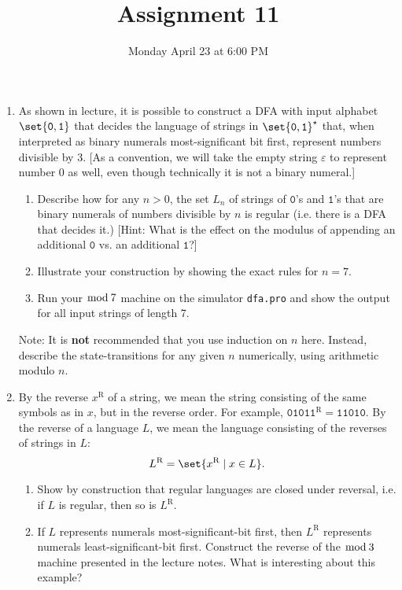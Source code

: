 \documentclass{cs81-homework}
\title{Assignment 11}
\date{Monday April 23 at 6:00 PM}
\author{}
\newcommand{\reverse}{{\text{R}}}
\begin{document}
\begin{introduction}
  \theintroduction
\end{introduction}

\begin{enumerate}
\item {} As shown in lecture, it is possible to construct a DFA with
  input alphabet \(\set{\mathtt 0, \mathtt 1}\) that decides the language of
  strings in \(\set{\mathtt 0, \mathtt 1}^\star\) that, when interpreted as
  binary numerals most-significant bit first, represent numbers divisible by 3.
  [As a convention, we will take the empty string \(\varepsilon\) to represent
  number \(0\) as well, even though technically it is not a binary numeral.]
  \begin{enumerate}
  \item Describe how for any \(n>0\), the set \(L_n\) of strings of
    \(\mathtt 0\)'s and \(\mathtt 1\)'s that are binary numerals of numbers
    divisible by \(n\) is regular (i.e. there is a DFA that decides it.)  [Hint:
    What is the effect on the modulus of appending an additional \(\mathtt 0\)
    vs. an additional \(\mathtt 1\)?]

  \item Illustrate your construction by showing the exact rules for \(n=7\).

  \item \label{part:mod-7-dfa} Run your \(\mathop{\bmod} 7\) machine on the
    simulator \texttt{dfa.pro} and show the output for all input strings of
    length 7.
  \end{enumerate}
  Note: It is \textbf{not} recommended that you use induction on \(n\) here.
  Instead, describe the state-transitions for any given \(n\) numerically, using
  arithmetic modulo \(n\).

\item {} \label{problem:reverse} By the reverse \(x^\reverse\) of a string,
  we mean the string consisting of the same symbols as in \(x\), but in the
  reverse order.  For example, \(\mathtt{01011}^\reverse = \mathtt{11010}\).  By
  the reverse of a language \(L\), we mean the language consisting of the
  reverses of strings in \(L\):
  \[
    L^\reverse = \set{x^\reverse \mid x \in L}.
  \]
  \begin{enumerate}
  \item Show by construction that regular languages are closed under reversal,
    i.e. if \(L\) is regular, then so is \(L^\reverse\).

  \item If \(L\) represents numerals most-significant-bit first, then
    \(L^\reverse\) represents numerals least-significant-bit first.  Construct
    the reverse of the \(\mathop{\bmod} 3\) machine presented in the lecture
    notes.  What is interesting about this example?


\end{enumerate}
\end{enumerate}
\end{document}
